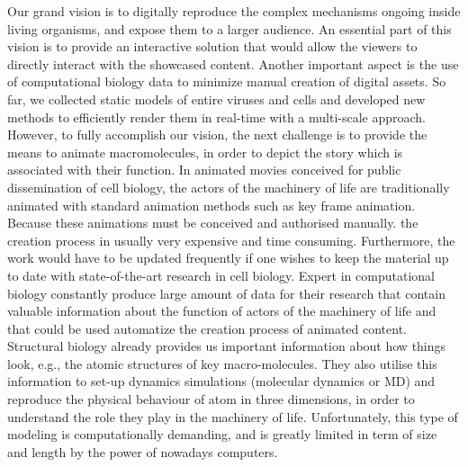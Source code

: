 Our grand vision is to digitally reproduce the complex mechanisms ongoing inside living organisms, and expose them to a larger audience.
An essential part of this vision is to provide an interactive solution that would allow the viewers to directly interact with the showcased content.
Another important aspect is the use of computational biology data to minimize manual creation of digital assets. 
So far, we collected static models of entire viruses and cells and developed new methods to efficiently render them in real-time with a multi-scale approach.
However, to fully accomplish our vision, the next challenge is to provide the means to animate macromolecules, in order to depict the story which is associated with their function.
In animated movies conceived for public dissemination of cell biology, the actors of the machinery of life are traditionally animated with standard animation methods such as key frame animation.
Because these animations must be conceived and authorised manually. the creation process in usually very expensive and time consuming.
Furthermore, the work would have to be updated frequently if one wishes to keep the material up to date with state-of-the-art research in cell biology.
Expert in computational biology constantly produce large amount of data for their research that contain valuable information about the function of actors of the machinery of life and that could be used automatize the creation process of animated content.
Structural biology already provides us important information about how things look, e.g., the atomic structures of key macro-molecules.
They also utilise this information to set-up dynamics simulations (molecular dynamics or MD) and reproduce the physical behaviour of atom in three dimensions, in order to understand the role they play in the machinery of life.
Unfortunately, this type of modeling is computationally demanding, and is greatly limited in term of size and length by the power of nowadays computers.

